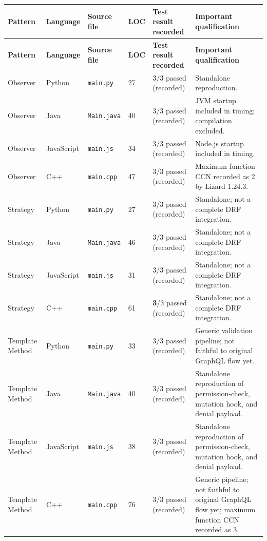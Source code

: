 \documentclass[11pt,a4paper]{article}
\newcommand{\code}[1]{\texttt{#1}}
\begin{document}
\begin{longtable}{p{2.0cm}p{1.6cm}p{1.6cm}p{1.8cm}p{2.5cm}p{3.6cm}}
\toprule
\textbf{Pattern} & \textbf{Language} & \textbf{Source file} & \textbf{LOC} & \textbf{Test result recorded} & \textbf{Important qualification} \\
\midrule
\endfirsthead
\toprule
\textbf{Pattern} & \textbf{Language} & \textbf{Source file} & \textbf{LOC} & \textbf{Test result recorded} & \textbf{Important qualification} \\
\midrule
\endhead
Observer & Python & \code{main.py} & 27 & 3/3 passed (recorded) & Standalone reproduction. \\
Observer & Java & \code{Main.java} & 40 & 3/3 passed (recorded) & JVM startup included in timing; compilation excluded. \\
Observer & JavaScript & \code{main.js} & 34 & 3/3 passed (recorded) & Node.js startup included in timing. \\
Observer & C++ & \code{main.cpp} & 47 & 3/3 passed (recorded) & Maximum function CCN recorded as 2 by Lizard 1.24.3. \\
\addlinespace
Strategy & Python & \code{main.py} & 27 & 3/3 passed (recorded) & Standalone; not a complete DRF integration. \\
Strategy & Java & \code{Main.java} & 46 & 3/3 passed (recorded) & Standalone; not a complete DRF integration. \\
Strategy & JavaScript & \code{main.js} & 31 & 3/3 passed (recorded) & Standalone; not a complete DRF integration. \\
Strategy & C++ & \code{main.cpp} & 61 & \textbf3/3 passed (recorded) &  Standalone; not a complete DRF integration. \\
\addlinespace
Template Method & Python & \code{main.py} & 33 & 3/3 passed (recorded) & Generic validation pipeline; not faithful to original GraphQL flow yet. \\
Template Method & Java & \code{Main.java} & 40 & 3/3 passed (recorded) & Standalone reproduction of permission-check, mutation hook, and denial payload. \\
Template Method & JavaScript & \code{main.js} & 38 & 3/3 passed (recorded) & Standalone reproduction of permission-check, mutation hook, and denial payload. \\
Template Method & C++ & \code{main.cpp} & 76 & 3/3 passed (recorded) & Generic pipeline; not faithful to original GraphQL flow yet; maximum function CCN recorded as 3. \\
\bottomrule
\end{longtable}
\end{document}
